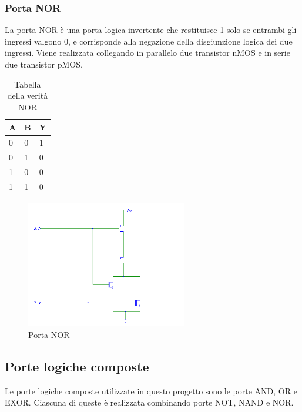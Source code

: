 \documentclass[10pt]{article}
\begin{document}
\begin{itemize}
\subsubsection{Porta NOR}
La porta NOR è una porta logica invertente che restituisce 1 solo se entrambi gli ingressi valgono 0, e corrisponde alla negazione della disgiunzione logica dei due ingressi. 
Viene realizzata collegando in parallelo due transistor nMOS e in serie due transistor pMOS.

\begin{table}[H]
    \begin{minipage}[b]{\textwidth}
    \centering
    \begin{tabular}{|ll|l|}
    \hline
    \textbf{A} & \textbf{B} & \textbf{Y} \\ \hline
    0          & 0          & 1          \\ 
    0          & 1          & 0          \\ 
    1          & 0          & 0          \\ 
    1          & 1          & 0          \\ \hline
    \end{tabular}
        \caption{Tabella della verità NOR}
        \label{table:student}
    \end{minipage}
    \end{table}
    
    \begin{figure}[H]
    \begin{minipage}[b]{\textwidth}
    
    \includegraphics[width=70mm]{nor}
    \caption{Porta NOR}
    \label{ }
    \end{minipage}
    \end{figure}

\subsection{Porte logiche composte}
Le porte logiche composte utilizzate in questo progetto sono le porte AND, OR e EXOR. Ciascuna di queste è realizzata combinando porte NOT, NAND e NOR.


\end{itemize}
\end{document}
